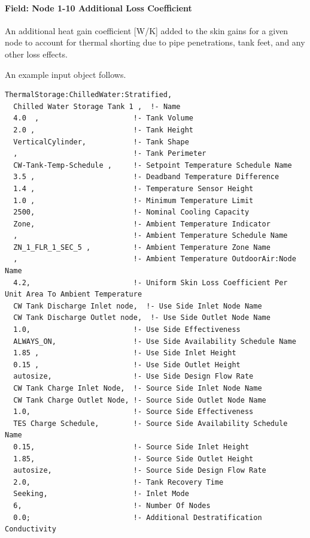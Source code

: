 \paragraph{Field: Node 1-10 Additional Loss Coefficient}\label{field-node-1-10-additional-loss-coefficient}

An additional heat gain coefficient {[}W/K{]} added to the skin gains for a given node to account for thermal shorting due to pipe penetrations, tank feet, and any other loss effects.

An example input object follows.

\begin{lstlisting}
ThermalStorage:ChilledWater:Stratified,
  Chilled Water Storage Tank 1 ,  !- Name
  4.0  ,                      !- Tank Volume
  2.0 ,                       !- Tank Height
  VerticalCylinder,           !- Tank Shape
  ,                           !- Tank Perimeter
  CW-Tank-Temp-Schedule ,     !- Setpoint Temperature Schedule Name
  3.5 ,                       !- Deadband Temperature Difference
  1.4 ,                       !- Temperature Sensor Height
  1.0 ,                       !- Minimum Temperature Limit
  2500,                       !- Nominal Cooling Capacity
  Zone,                       !- Ambient Temperature Indicator
  ,                           !- Ambient Temperature Schedule Name
  ZN_1_FLR_1_SEC_5 ,          !- Ambient Temperature Zone Name
  ,                           !- Ambient Temperature OutdoorAir:Node Name
  4.2,                        !- Uniform Skin Loss Coefficient Per Unit Area To Ambient Temperature
  CW Tank Discharge Inlet node,  !- Use Side Inlet Node Name
  CW Tank Discharge Outlet node,  !- Use Side Outlet Node Name
  1.0,                        !- Use Side Effectiveness
  ALWAYS_ON,                  !- Use Side Availability Schedule Name
  1.85 ,                      !- Use Side Inlet Height
  0.15 ,                      !- Use Side Outlet Height
  autosize,                   !- Use Side Design Flow Rate
  CW Tank Charge Inlet Node,  !- Source Side Inlet Node Name
  CW Tank Charge Outlet Node, !- Source Side Outlet Node Name
  1.0,                        !- Source Side Effectiveness
  TES Charge Schedule,        !- Source Side Availability Schedule Name
  0.15,                       !- Source Side Inlet Height
  1.85,                       !- Source Side Outlet Height
  autosize,                   !- Source Side Design Flow Rate
  2.0,                        !- Tank Recovery Time
  Seeking,                    !- Inlet Mode
  6,                          !- Number Of Nodes
  0.0;                        !- Additional Destratification Conductivity
\end{lstlisting}

